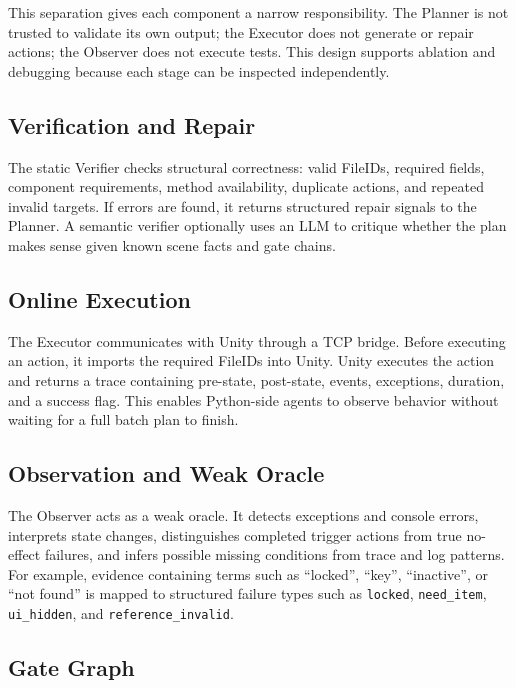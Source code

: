 \documentclass[10pt,conference]{IEEEtran}
\begin{document}
This separation gives each component a narrow responsibility. The Planner is not
trusted to validate its own output; the Executor does not generate or repair
actions; the Observer does not execute tests. This design supports ablation and
debugging because each stage can be inspected independently.

\subsection{Verification and Repair}

The static Verifier checks structural correctness: valid FileIDs, required
fields, component requirements, method availability, duplicate actions, and
repeated invalid targets. If errors are found, it returns structured repair
signals to the Planner. A semantic verifier optionally uses an LLM to critique
whether the plan makes sense given known scene facts and gate chains.

\subsection{Online Execution}

The Executor communicates with Unity through a TCP bridge. Before executing an
action, it imports the required FileIDs into Unity. Unity executes the action and
returns a trace containing pre-state, post-state, events, exceptions, duration,
and a success flag. This enables Python-side agents to observe behavior without
waiting for a full batch plan to finish.

\subsection{Observation and Weak Oracle}

The Observer acts as a weak oracle. It detects exceptions and console errors,
interprets state changes, distinguishes completed trigger actions from true
no-effect failures, and infers possible missing conditions from trace and log
patterns. For example, evidence containing terms such as ``locked'', ``key'',
``inactive'', or ``not found'' is mapped to structured failure types such as
\texttt{locked}, \texttt{need\_item}, \texttt{ui\_hidden}, and
\texttt{reference\_invalid}.

\subsection{Gate Graph}
\end{document}
